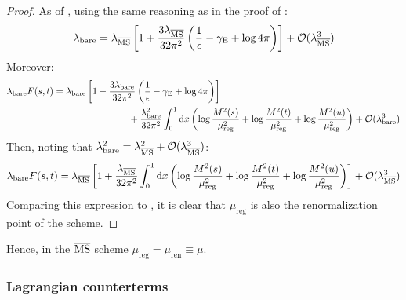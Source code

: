 \begin{proofbox}
  \begin{proof}
    As of , using the same reasoning as in the proof of :
    \begin{equation}
      \lambda_\text{bare} = \lambda_{\overline{\text{MS}}} \left[ 1 + \frac{3\lambda_{\overline{\text{MS}}}}{32\pi^2} \left( \frac{1}{\epsilon} - \gamma_\text{E} + \log 4\pi \right) \right] + \mathcal{O}(\lambda_{\overline{\text{MS}}}^3)
    \end{equation}
    Moreover:
    \begin{equation*}
      \begin{split}
        \lambda_\text{bare} F(s,t)
        & = \lambda_\text{bare} \left[ 1 - \frac{3\lambda_\text{bare}}{32\pi^2} \left( \frac{1}{\epsilon} - \gamma_\text{E} + \log 4\pi \right) \right] \\
        & \qquad \qquad \qquad \qquad  + \frac{\lambda_\text{bare}^2}{32\pi^2} \int_0^1 \mathrm{d} x \left( \log \frac{M^2(s)}{\mu_\text{reg}^2} + \log \frac{M^2(t)}{\mu_\text{reg}^2} + \log \frac{M^2(u)}{\mu_\text{reg}^2} \right) + \mathcal{O}(\lambda_\text{bare}^3) \\
      \end{split}
    \end{equation*}
    Then, noting that $ \lambda_\text{bare}^2 = \lambda_{\overline{\text{MS}}}^2 + \mathcal{O}(\lambda_{\overline{\text{MS}}}^3) $:
    \begin{equation*}
      \lambda_\text{bare} F(s,t) = \lambda_{\overline{\text{MS}}} \left[ 1 + \frac{\lambda_{\overline{\text{MS}}}}{32\pi^2} \int_0^1 \mathrm{d} x \left( \log \frac{M^2(s)}{\mu_\text{reg}^2} + \log \frac{M^2(t)}{\mu_\text{reg}^2} + \log \frac{M^2(u)}{\mu_\text{reg}^2} \right) \right] + \mathcal{O}(\lambda_{\overline{\text{MS}}}^3)
    \end{equation*}
    Comparing this expression to , it is clear that $ \mu_\text{reg} $ is also the renormalization point of the scheme.
  \end{proof}
\end{proofbox}

Hence, in the $ \overline{\text{MS}} $ scheme $ \mu_\text{reg} = \mu_\text{ren} \equiv \mu $.

\subsubsection{Lagrangian counterterms}

